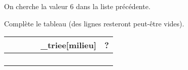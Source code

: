 \begin{exercice}

	On cherche la valeur 6 dans la liste précédente.

	Complète le tableau (des lignes resteront peut-être vides).
	\begin{center}
		\tabularstyled
		\begin{tabular}{|c|c|c|c|c|c|}
			\hline
			\rowcolor{UGLiOrange}{\thsn°itér} & {\thsgauche} & {\thsdroite} & {\thsmilieu} & {\thsliste\_triee[milieu]} & {\thsreturn ?} \\
			\hline
			                                                   &                               &                               &                               &                                             &                                 \\
			\hline
			                                                   &                               &                               &                               &                                             &                                 \\
			\hline
			                                                   &                               &                               &                               &                                             &                                 \\
			\hline
			                                                   &                               &                               &                               &                                             &                                 \\
			\hline
		\end{tabular}
	\end{center}


\end{exercice}
